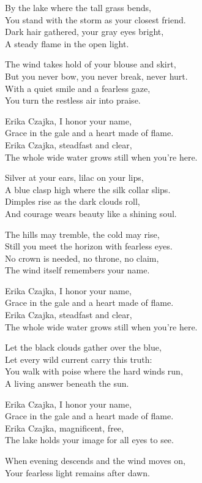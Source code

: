 \begin{lyrics}
By the lake where the tall grass bends,\\
You stand with the storm as your closest friend.\\
Dark hair gathered, your gray eyes bright,\\
A steady flame in the open light.

The wind takes hold of your blouse and skirt,\\
But you never bow, you never break, never hurt.\\
With a quiet smile and a fearless gaze,\\
You turn the restless air into praise.

Erika Czajka, I honor your name,\\
Grace in the gale and a heart made of flame.\\
Erika Czajka, steadfast and clear,\\
The whole wide water grows still when you’re here.

Silver at your ears, lilac on your lips,\\
A blue clasp high where the silk collar slips.\\
Dimples rise as the dark clouds roll,\\
And courage wears beauty like a shining soul.

The hills may tremble, the cold may rise,\\
Still you meet the horizon with fearless eyes.\\
No crown is needed, no throne, no claim,\\
The wind itself remembers your name.

Erika Czajka, I honor your name,\\
Grace in the gale and a heart made of flame.\\
Erika Czajka, steadfast and clear,\\
The whole wide water grows still when you’re here.

Let the black clouds gather over the blue,\\
Let every wild current carry this truth:\\
You walk with poise where the hard winds run,\\
A living answer beneath the sun.

Erika Czajka, I honor your name,\\
Grace in the gale and a heart made of flame.\\
Erika Czajka, magnificent, free,\\
The lake holds your image for all eyes to see.

When evening descends and the wind moves on,\\
Your fearless light remains after dawn.
\end{lyrics}

